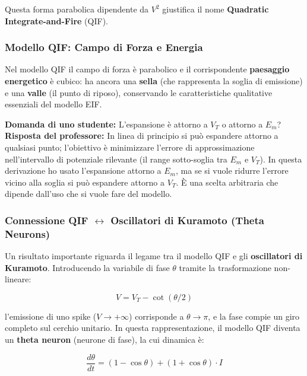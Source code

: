 Questa forma parabolica dipendente da $V^2$ giustifica il nome \textbf{Quadratic Integrate-and-Fire} (QIF).

\subsubsection{Modello QIF: Campo di Forza e Energia}

Nel modello QIF il campo di forza è parabolico e il corrispondente \textbf{paesaggio energetico} è cubico: ha ancora una \textbf{sella} (che rappresenta la soglia di emissione) e una \textbf{valle} (il punto di riposo), conservando le caratteristiche qualitative essenziali del modello EIF.

\begin{tcolorbox}[colback=gray!5, colframe=gray!40, arc=2mm, boxrule=0.5pt]
\textbf{Domanda di uno studente:} L'espansione è attorno a $V_T$ o attorno a $E_m$?\\
\textbf{Risposta del professore:} In linea di principio si può espandere attorno a qualsiasi punto; l'obiettivo è minimizzare l'errore di approssimazione nell'intervallo di potenziale rilevante (il range sotto-soglia tra $E_m$ e $V_T$). In questa derivazione ho usato l'espansione attorno a $E_m$, ma se si vuole ridurre l'errore vicino alla soglia si può espandere attorno a $V_T$. È una scelta arbitraria che dipende dall'uso che si vuole fare del modello.
\end{tcolorbox}

\subsubsection{Connessione QIF $\leftrightarrow$ Oscillatori di Kuramoto (Theta Neurons)}

Un risultato importante riguarda il legame tra il modello QIF e gli \textbf{oscillatori di Kuramoto}. Introducendo la variabile di fase $\theta$ tramite la trasformazione non-lineare:

\begin{equation}
V = V_T - \cot(\theta/2)
\end{equation}

l'emissione di uno spike ($V \to +\infty$) corrisponde a $\theta \to \pi$, e la fase compie un giro completo sul cerchio unitario. In questa rappresentazione, il modello QIF diventa un \textbf{theta neuron} (neurone di fase), la cui dinamica è:

\begin{equation}
\frac{d\theta}{dt} = (1 - \cos\theta) + (1 + \cos\theta) \cdot I
\end{equation}

